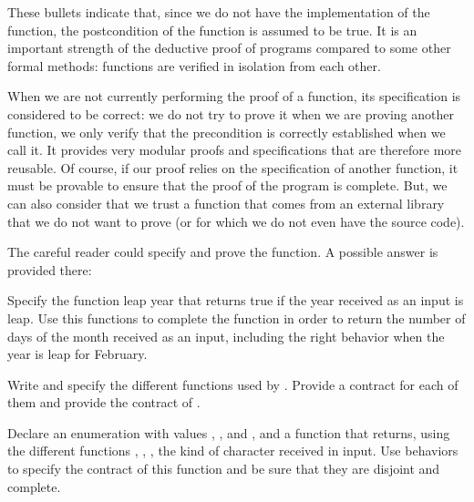 

These bullets indicate that, since we do not have the implementation
of the function, the postcondition of the function is assumed to be
true. It is an important strength of the deductive proof of programs
compared to some other formal methods: functions are verified in
isolation from each other.

When we are not currently performing the proof of a function, its
specification is considered to be correct: we do not try to prove it
when we are proving another function, we only verify that the
precondition is correctly established when we call it. It provides very
modular proofs and specifications that are therefore more reusable. Of
course, if our proof relies on the specification of another function, it
must be provable to ensure that the proof of the program is complete.
But, we can also consider that we trust a function that comes from an
external library that we do not want to prove (or for which we do not
even have the source code).

The careful reader could specify and prove the 
function. A possible answer is provided there:








\label{l4:contract-modularity-ex-days-of-month}


Specify the function leap year that returns true if the year received
as an input is leap. Use this functions to complete the function
 in order to return the number of days of the
month received as an input, including the right behavior when the year
is leap for February.





\label{l4:contract-modularity-ex-alpha-num}


Write and specify the different functions used by
. Provide a contract for each of them and
provide the contract of .





Declare an enumeration with values , ,
 and , and a function
 that returns, using the different
functions , ,
, the kind of character received in input. Use
behaviors to specify the contract of this function and be sure that
they are disjoint and complete.




